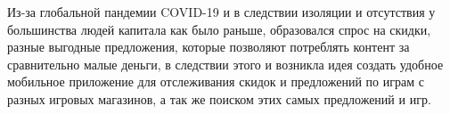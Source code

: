 Из-за глобальной пандемии COVID-19 и в следствии изоляции и отсутствия у большинства людей капитала как было раньше, образовался спрос на скидки, разные выгодные предложения, которые позволяют потреблять контент за сравнительно малые деньги, в следствии этого и возникла идея создать удобное мобильное приложение для отслеживания скидок и предложений по играм с разных игровых магазинов, а так же поиском этих самых предложений и игр.